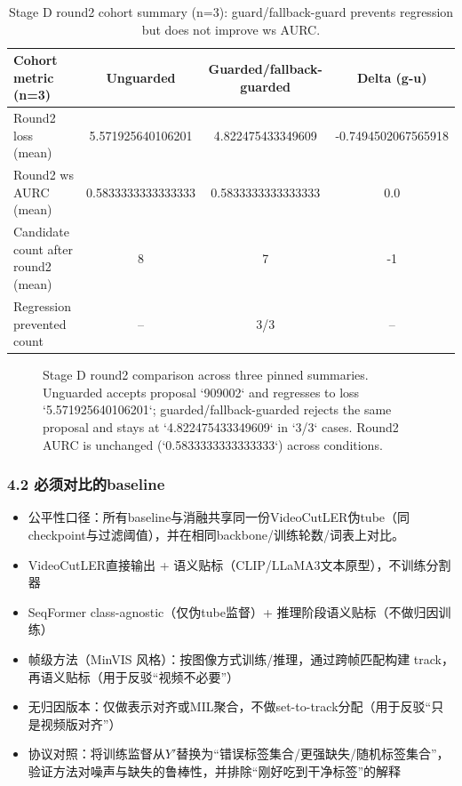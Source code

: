 \documentclass[UTF8]{ctexart}
\begin{document}
\begin{table}[htbp]
\centering
\caption{Stage D round2 cohort summary (n=3): guard/fallback-guard prevents regression but does not improve ws AURC.}
\label{tab:stage_d_main_cohort}
\begin{tabular}{lccc}
\hline
Cohort metric (n=3) & Unguarded & Guarded/fallback-guarded & Delta (g-u) \\
\hline
Round2 loss (mean) & 5.571925640106201 & 4.822475433349609 & -0.7494502067565918 \\
Round2 ws AURC (mean) & 0.5833333333333333 & 0.5833333333333333 & 0.0 \\
Candidate count after round2 (mean) & 8 & 7 & -1 \\
Regression prevented count & -- & 3/3 & -- \\
\hline
\end{tabular}
\end{table}

\begin{figure}[htbp]
\centering
{}
\caption{Stage D round2 comparison across three pinned summaries. Unguarded accepts proposal `909002` and regresses to loss `5.571925640106201`; guarded/fallback-guarded rejects the same proposal and stays at `4.822475433349609` in `3/3` cases. Round2 AURC is unchanged (`0.5833333333333333`) across conditions.}
\label{fig:stage_d_main_round2}
\end{figure}

\subsubsection*{4.2 必须对比的baseline}
\begin{itemize}
\item 公平性口径：所有baseline与消融共享同一份VideoCutLER伪tube（同checkpoint与过滤阈值），并在相同backbone/训练轮数/词表上对比。
\item VideoCutLER直接输出 + 语义贴标（CLIP/LLaMA3文本原型），不训练分割器
\item SeqFormer class-agnostic（仅伪tube监督）+ 推理阶段语义贴标（不做归因训练）
\item 帧级方法（MinVIS 风格）：按图像方式训练/推理，通过跨帧匹配构建 track，再语义贴标（用于反驳“视频不必要”）
\item 无归因版本：仅做表示对齐或MIL聚合，不做set-to-track分配（用于反驳“只是视频版对齐”）
\item 协议对照：将训练监督从$Y'$替换为“错误标签集合/更强缺失/随机标签集合”，验证方法对噪声与缺失的鲁棒性，并排除“刚好吃到干净标签”的解释
\end{itemize}
\end{document}
